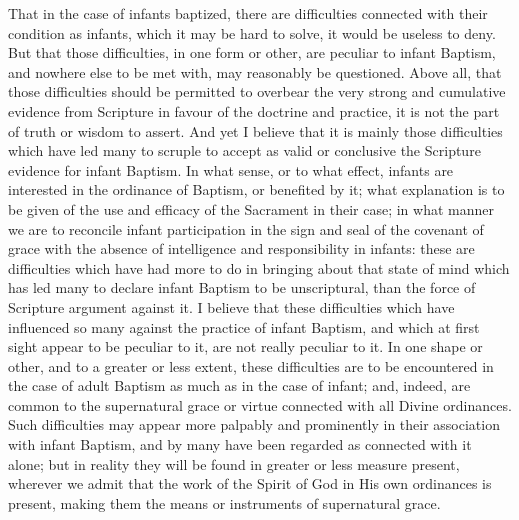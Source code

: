 \documentclass[
  english,
]{book}
\begin{document}
That in the case of infants baptized, there are difficulties connected with their condition as infants, which it may be hard to solve, it would be useless to deny. But that those difficulties, in one form or other, are peculiar to infant Baptism, and nowhere else to be met with, may reasonably be questioned. Above all, that those difficulties should be permitted to overbear the very strong and cumulative evidence from Scripture in favour of the doctrine and practice, it is not the part of truth or wisdom to assert. And yet I believe that it is mainly those difficulties which have led many to scruple to accept as valid or conclusive the Scripture evidence for infant Baptism. In what sense, or to what effect, infants are interested in the ordinance of Baptism, or benefited by it; what explanation is to be given of the use and efficacy of the Sacrament in their case; in what manner we are to reconcile infant participation in the sign and seal of the covenant of grace with the absence of intelligence and responsibility in infants: these are difficulties which have had more to do in bringing about that state of mind which has led many to declare infant Baptism to be unscriptural, than the force of Scripture argument against it. I believe that these difficulties which have influenced so many against the practice of infant Baptism, and which at first sight appear to be peculiar to it, are not really peculiar to it. In one shape or other, and to a greater or less extent, these difficulties are to be encountered in the case of adult Baptism as much as in the case of infant; and, indeed, are common to the supernatural grace or virtue connected with all Divine ordinances. Such difficulties may appear more palpably and prominently in their association with infant Baptism, and by many have been regarded as connected with it alone; but in reality they will be found in greater or less measure present, wherever we admit that the work of the Spirit of God in His own ordinances is present, making them the means or instruments of supernatural grace.
\end{document}
